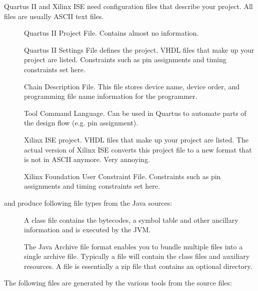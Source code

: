 Quartus II and Xilinx ISE need configuration files that describe
your project. All files are usually ASCII text files.

\begin{description}

\item[] Quartus II Project File. Contains almost no
information.
\item[] Quartus II Settings File defines the project. VHDL
files that make up your project are listed. Constraints such as pin
assignments and timing constraints set here.
\item[] Chain Description File. This file
stores device name, device order, and programming file name
information for the programmer.
\item[] Tool Command Language. Can be used in Quartus to
automate parts of the design flow (e.g. pin assignment).

\item[] Xilinx ISE project. VHDL
files that make up your project are listed. The actual version of
Xilinx ISE converts this project file to a new format that is not in
ASCII anymore. Very annoying.
\item[] Xilinx Foundation User Constraint File. Constraints
such as pin assignments and timing constraints set here.

\end{description}

 and  produce following file types from the Java
sources:

\begin{description}

\item[] A class file contains the bytecodes, a symbol table and other
ancillary information and is executed by the JVM.

\item[] The Java Archive file format enables you to bundle multiple files
into a single archive file. Typically a  file will
contain the class files and auxiliary resources. A  file
is essentially a zip file that contains an optional
 directory.

\end{description}

The following files are generated by the various tools from the
source files:


